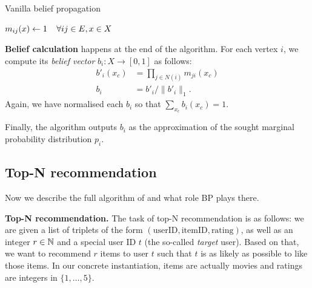 \documentclass[final,letterpaper]{article}
\newcommand{\mypar}[1]{{\bf #1.}}
\newcommand{\myparcont}[1]{{\bf #1}}
\begin{document}
\begin{algorithm}
\caption{Vanilla belief propagation}
\label{algo:propagate}
\algodefaults
	$m_{ij}(x) \leftarrow 1\mkern 20mu\forall ij \in E, x \in X$\;
	
\end{algorithm}

\myparcont{Belief calculation} happens at the end of the algorithm. For each
vertex $i$, we compute its \emph{belief vector} $b_i: X \to [0, 1]$ as follows:
%
\begin{align*}
	b'_i(x_c) &= \prod_{j \in N(i)} m_{ji}(x_c) \\
	b_i &= b'_{i} / \|b'_i\|_1.
\end{align*}
%
Again, we have normalised each $b_i$ so that $\sum_{x_c} b_i(x_c) = 1$.

Finally, the algorithm outputs $b_i$ as the approximation of the sought
marginal probability distribution $p_i$.

\subsection{Top-N recommendation} \label{subsec:topn}

Now we describe the full algorithm of
\citet{top-n-recommendation} and what role BP plays there.

\mypar{Top-N recommendation} The task of top-N recommendation is as follows: we
are given a list of triplets of the form $(\text{userID}, \text{itemID},
\text{rating})$, as well as an integer $r\in\mathbb{N}$ and a special user ID $t$ (the
so-called \emph{target} user). Based on that, we want to recommend $r$ items to
user $t$ such that $t$ is as likely as possible to like those items.
%
In our concrete instantiation, items are actually movies and ratings are
integers in $\{1, \ldots, 5\}$.
\end{document}
